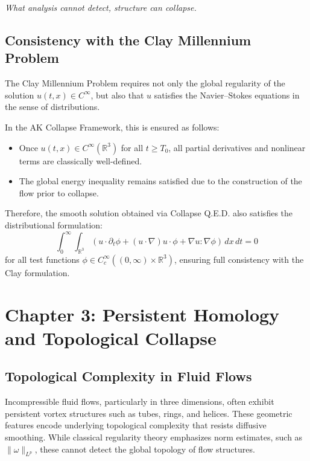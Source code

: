 \documentclass[11pt]{article}
\begin{document}
\begin{center}
\emph{What analysis cannot detect, structure can collapse.}
\end{center}

\subsection*{Consistency with the Clay Millennium Problem}

The Clay Millennium Problem requires not only the global regularity of the solution \( u(t,x) \in C^\infty \), but also that \( u \) satisfies the Navier--Stokes equations in the sense of distributions.

In the AK Collapse Framework, this is ensured as follows:
\begin{itemize}
  \item Once \( u(t,x) \in C^\infty(\mathbb{R}^3) \) for all \( t \geq T_0 \), all partial derivatives and nonlinear terms are classically well-defined.
  \item The global energy inequality remains satisfied due to the construction of the flow prior to collapse.
\end{itemize}

Therefore, the smooth solution obtained via Collapse Q.E.D. also satisfies the distributional formulation:
\[
\int_0^\infty \!\! \int_{\mathbb{R}^3} \left( u \cdot \partial_t \phi + (u \cdot \nabla)u \cdot \phi + \nabla u : \nabla \phi \right) \, dx \, dt = 0
\]
for all test functions \( \phi \in C_c^\infty((0,\infty) \times \mathbb{R}^3) \), ensuring full consistency with the Clay formulation.




\section{Chapter 3: Persistent Homology and Topological Collapse}
\label{sec:PH-collapse}

\subsection{Topological Complexity in Fluid Flows}

Incompressible fluid flows, particularly in three dimensions, often exhibit persistent vortex structures such as tubes, rings, and helices. These geometric features encode underlying topological complexity that resists diffusive smoothing. While classical regularity theory emphasizes norm estimates, such as \( \| \omega \|_{L^p} \), these cannot detect the global topology of flow structures.
\end{document}
